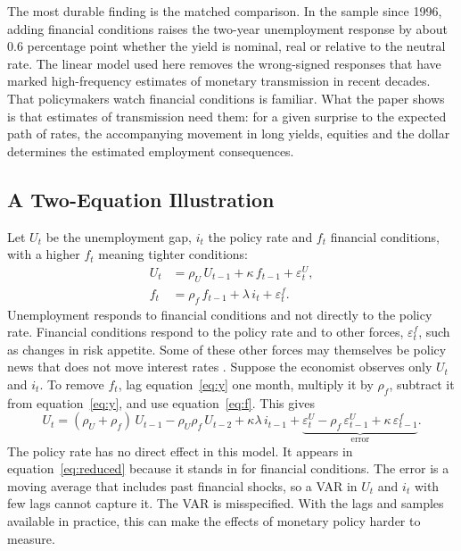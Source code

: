 \documentclass[11pt]{article}
\begin{document}
The most durable finding is the matched comparison. In the sample since 1996, adding financial conditions raises the two-year unemployment response by about 0.6 percentage point whether the yield is nominal, real or relative to the neutral rate. The linear model used here removes the wrong-signed responses that have marked high-frequency estimates of monetary transmission in recent decades. That policymakers watch financial conditions is familiar. What the paper shows is that estimates of transmission need them: for a given surprise to the expected path of rates, the accompanying movement in long yields, equities and the dollar determines the estimated employment consequences.

\FloatBarrier



\FloatBarrier
\newpage
\begin{appendices}
\renewcommand{\thetable}{\Alph{section}\arabic{table}}
\renewcommand{\thefigure}{\Alph{section}\arabic{figure}}
\setcounter{table}{0}
\setcounter{figure}{0}
\FloatBarrier
\section{A Two-Equation Illustration}\label{app:toy}
Let $U_t$ be the unemployment gap, $i_t$ the policy rate and $f_t$ financial conditions, with a higher $f_t$ meaning tighter conditions:
\begin{align}
U_t &= \rho_U\,U_{t-1} + \kappa\,f_{t-1} + \varepsilon^{U}_t, \label{eq:y}\\
f_t &= \rho_f\,f_{t-1} + \lambda\,i_t + \varepsilon^{f}_t. \label{eq:f}
\end{align}
Unemployment responds to financial conditions and not directly to the policy rate. Financial conditions respond to the policy rate and to other forces, $\varepsilon^{f}_t$, such as changes in risk appetite. Some of these other forces may themselves be policy news that does not move interest rates \citep{boehm2024,bauer2026}. Suppose the economist observes only $U_t$ and $i_t$. To remove $f_t$, lag equation~\eqref{eq:y} one month, multiply it by $\rho_f$, subtract it from equation~\eqref{eq:y}, and use equation~\eqref{eq:f}. This gives
\begin{equation}
U_t = (\rho_U+\rho_f)\,U_{t-1} - \rho_U\rho_f\,U_{t-2} + \kappa\lambda\,i_{t-1} + \underbrace{\varepsilon^{U}_t - \rho_f\,\varepsilon^{U}_{t-1} + \kappa\,\varepsilon^{f}_{t-1}}_{\text{error}}. \label{eq:reduced}
\end{equation}
The policy rate has no direct effect in this model. It appears in equation~\eqref{eq:reduced} because it stands in for financial conditions. The error is a moving average that includes past financial shocks, so a VAR in $U_t$ and $i_t$ with few lags cannot capture it. The VAR is misspecified. With the lags and samples available in practice, this can make the effects of monetary policy harder to measure.


\end{appendices}
\end{document}
